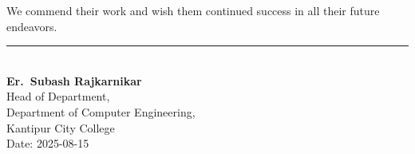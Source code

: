 \documentclass[12pt, a4paper]{report}
\begin{document}
We commend their work and wish them continued success in all their future endeavors.

\vspace{2cm}

\noindent\rule{5cm}{0.4pt}\\[0.2cm]
\textbf{Er.~Subash Rajkarnikar}\\
Head of Department,\\
Department of Computer Engineering,\\
Kantipur City College\\[0.4cm]
Date: 2025-08-15

\newpage

\tableofcontents

\newpage
{}
\setcounter{page}{1}

% 
\end{document}
